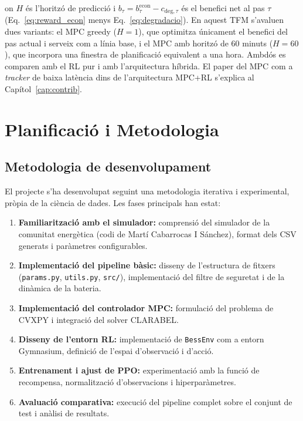 \documentclass[a4paper,12pt,twoside]{ThesisStyle}
\begin{document}
on $H$ és l'horitzó de predicció i $b_\tau = b_\tau^{\mathrm{econ}} - c_{\mathrm{deg},\tau}$ és el benefici net al pas $\tau$ (Eq.~\eqref{eq:reward_econ} menys Eq.~\eqref{eq:degradacio}). En aquest TFM s'avaluen dues variants: el MPC greedy ($H=1$), que optimitza únicament el benefici del pas actual i serveix com a línia base, i el MPC amb horitzó de 60 minuts ($H=60$), que incorpora una finestra de planificació equivalent a una hora. Ambdós es comparen amb el RL pur i amb l'arquitectura híbrida. El paper del MPC com a \textit{tracker} de baixa latència dins de l'arquitectura MPC+RL s'explica al Capítol~\ref{cap:contrib}.

\chapter{Planificació i Metodologia}
\label{cap:plan}

\section{Metodologia de desenvolupament}

El projecte s'ha desenvolupat seguint una metodologia iterativa i experimental, pròpia de la ciència de dades. Les fases principals han estat:

\begin{enumerate}
    \item \textbf{Familiarització amb el simulador:} comprensió del simulador de la comunitat energètica (codi de Martí Cabarrocas I Sánchez), format dels CSV generats i paràmetres configurables.
    \item \textbf{Implementació del pipeline bàsic:} disseny de l'estructura de fitxers (\allowbreak\texttt{params.py}, \texttt{utils.py}, \texttt{src/}), implementació del filtre de seguretat i de la dinàmica de la bateria.
    \item \textbf{Implementació del controlador MPC:} formulació del problema de CVXPY i integració del solver CLARABEL.
    \item \textbf{Disseny de l'entorn RL:} implementació de \texttt{BessEnv} com a entorn Gymnasium, definició de l'espai d'observació i d'acció.
    \item \textbf{Entrenament i ajust de PPO:} experimentació amb la funció de recompensa, normalització d'observacions i hiperparàmetres.
    \item \textbf{Avaluació comparativa:} execució del pipeline complet sobre el conjunt de test i anàlisi de resultats.
\end{enumerate}
\end{document}

